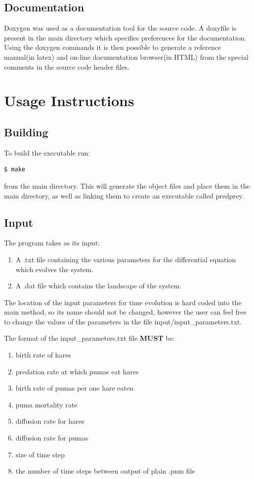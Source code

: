 \subsection{Documentation}
Doxygen was used as a documentation tool for the source code. A doxyfile is present in the main directory which specifies preferences for the documentation. Using the doxygen commands it is then possible to generate a reference manual(in latex) and on-line documentation browser(in HTML) from the special comments in the source code header files. 

\section{Usage Instructions}

\subsection{Building}
To build the executable run:
\begin{lstlisting}[language=bash]
$ make

\end{lstlisting}
from the main directory. This will generate the object files and place them in the main directory, as well as linking them to create an executable called predprey.

\subsection{Input}
The program takes as its input: 
\begin{enumerate}
\item A .txt file containing the various parameters for the differential equation which evolves the system. 
\item A .dat file which contains the landscape of the system. 
\end{enumerate}

The location of the input parameters for time evolution is hard coded into the main method, so its name should not be changed, however the user can feel free to change the values of the parameters in the file input/input_parameters.txt.

The format of the input_parameters.txt file \textbf{MUST} be:
\begin{enumerate}
\item birth rate of hares 
\item predation rate at which pumas eat hares
\item birth rate of pumas per one hare eaten
\item puma mortality rate
\item diffusion rate for hares
\item diffusion rate for pumas
\item size of time step
\item the number of time steps between output of plain .pnm file
\end{enumerate}

